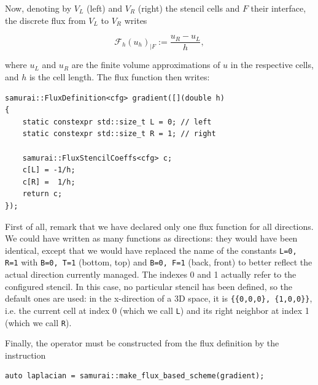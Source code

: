 Now, denoting by $V_L$ (left) and $V_R$ (right) the stencil cells and $F$ their interface, the discrete flux from $V_L$ to $V_R$ writes

\begin{equation*}
    \mathcal{F}_h(u_h)_{|F} := \frac{u_R-u_L}{h},
\end{equation*}

where $u_L$ and $u_R$ are the finite volume approximations of $u$ in the respective cells, and $h$ is the cell length.
The flux function then writes:

\begin{listing}[ht]
    \begin{verbatim}
samurai::FluxDefinition<cfg> gradient([](double h)
{
    static constexpr std::size_t L = 0; // left
    static constexpr std::size_t R = 1; // right

    samurai::FluxStencilCoeffs<cfg> c;
    c[L] = -1/h;
    c[R] =  1/h;
    return c;
});
\end{verbatim}
\end{listing}

First of all, remark that we have declared only one flux function for all directions.
We could have written as many functions as directions:
they would have been identical, except that we would have replaced the name of the constants
\verb!L=0, R=1! with \verb!B=0, T=1! (bottom, top) and \verb!B=0, F=1! (back, front) to better reflect the actual direction currently managed.
The indexes 0 and 1 actually refer to the configured stencil.
In this case, no particular stencil has been defined, so the default ones are used: in the x-direction of a 3D space,
it is \verb!{{0,0,0}, {1,0,0}}!, i.e. the current cell at index 0 (which we call \verb!L!) and its right neighbor at index 1 (which we call \verb!R!).

Finally, the operator must be constructed from the flux definition by the instruction

\begin{listing}[ht]
    \begin{verbatim}
auto laplacian = samurai::make_flux_based_scheme(gradient);
\end{verbatim}
\end{listing}

